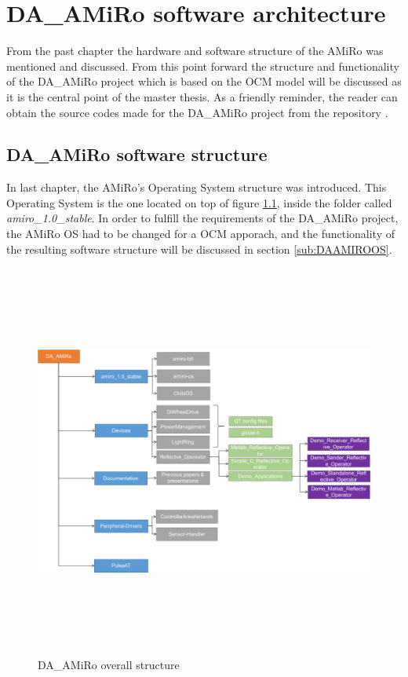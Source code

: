 \documentclass[12pt]{report}%
\begin{document}
\chapter{DA\_AMiRo software architecture}
From the past chapter the hardware and software structure of the AMiRo was mentioned and discussed. From this point forward the structure and functionality of the DA\_AMiRo project which is based on the OCM model will be discussed as it is the central point of the master thesis. As a friendly reminder, the reader can obtain the source codes made for the DA\_AMiRo project from the repository \cite{AMiRo_Git}.

\section{DA\_AMiRo software structure}
In last chapter, the AMiRo's Operating System structure was introduced. This Operating System is the one located on top of figure \ref{fig:DAAMIROstr}, inside the folder called \textit{amiro\_1.0\_stable}. In order to fulfill the requirements of the DA\_AMiRo project, the AMiRo OS had to be changed for a OCM apporach, and the functionality of the resulting software structure will be discussed in section \ref{sub:DAAMIROOS}.

\begin{figure}[ht]
	\centering
	\includegraphics[width=\textwidth, height=13cm]{DAAMIRO}
    \caption{DA\_AMiRo overall structure}
    \label{fig:DAAMIROstr}
\end{figure}
\end{document}
